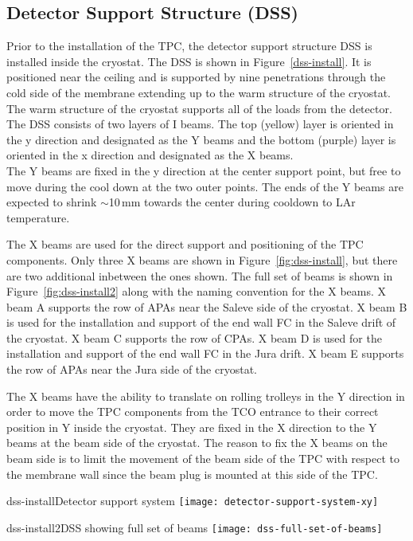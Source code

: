 \subsection{Detector Support Structure (DSS)}


Prior to the installation of the TPC, the detector support structure DSS is installed inside the cryostat.  The DSS is shown in Figure~\ref{dss-install}.  It is positioned near the ceiling and is supported by nine penetrations through the cold side of the membrane extending up to the warm structure of the cryostat.  The warm structure of the cryostat supports all of the loads from the detector.  The DSS consists of two layers of I beams.  The top (yellow) layer is oriented in the y direction and designated as the Y beams and the bottom (purple) layer is oriented in the x direction and designated as the X beams. \\
The Y beams are fixed in the y direction at the center support point, but free to move during the cool down at the two outer points.  The ends of the Y beams are expected to shrink $\sim$10\,mm towards the center during cooldown to LAr temperature.  

The X beams are used for the direct support and positioning of the TPC components.  Only three X beams are shown in Figure~\ref{fig:dss-install}, but there are two additional inbetween the ones shown.  
The full set of beams is shown in Figure~\ref{fig:dss-install2} along with the naming convention for the X beams.
 X beam A supports the row of APAs near the Saleve side of the cryostat.  X beam B is used for the installation and support of the end wall FC in the Saleve drift of the cryostat.  X beam C supports the row of CPAs.  X beam D is used for the installation and support of the end wall FC in the Jura drift.  X beam E supports the row of APAs near the Jura side of the cryostat.  

The X beams have the ability to translate on rolling trolleys in the Y direction in order to move the TPC components from the TCO entrance to their correct position in Y inside the cryostat.  They are fixed in the X direction to the Y beams at the beam side of the cryostat.  The reason 
to fix the X beams on the beam side is to limit the movement of the beam side of the TPC with respect to the membrane wall since
the beam plug is mounted at this side of the TPC.  

\begin{cdrfigure}{dss-install}{Detector support system}
\texttt{[image: detector-support-system-xy]}
\end{cdrfigure}

\begin{cdrfigure}{dss-install2}{DSS showing full set of beams}
 \texttt{[image: dss-full-set-of-beams]}
\end{cdrfigure}